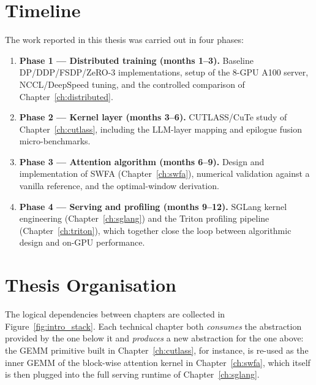 \section{Timeline}\label{sec:intro_timeline}
The work reported in this thesis was carried out in four phases:
\begin{enumerate}
    \item \textbf{Phase 1 --- Distributed training (months 1--3).}
          Baseline DP/DDP/FSDP/ZeRO-3 implementations, setup of the
          8-GPU A100 server, NCCL/DeepSpeed tuning, and the controlled
          comparison of Chapter~\ref{ch:distributed}.
    \item \textbf{Phase 2 --- Kernel layer (months 3--6).} CUTLASS/CuTe
          study of Chapter~\ref{ch:cutlass}, including the LLM-layer
          mapping and epilogue fusion micro-benchmarks.
    \item \textbf{Phase 3 --- Attention algorithm (months 6--9).}
          Design and implementation of SWFA
          (Chapter~\ref{ch:swfa}), numerical validation against a
          vanilla reference, and the optimal-window derivation.
    \item \textbf{Phase 4 --- Serving and profiling (months 9--12).}
          SGLang kernel engineering
          (Chapter~\ref{ch:sglang}) and the Triton profiling pipeline
          (Chapter~\ref{ch:triton}), which together close the loop
          between algorithmic design and on-GPU performance.
\end{enumerate}

\section{Thesis Organisation}\label{sec:intro_organisation}
The logical dependencies between chapters are collected in
Figure~\ref{fig:intro_stack}. Each technical chapter both
\emph{consumes} the abstraction provided by the one below it and
\emph{produces} a new abstraction for the one above: the GEMM
primitive built in Chapter~\ref{ch:cutlass}, for instance, is
re-used as the inner GEMM of the block-wise attention kernel in
Chapter~\ref{ch:swfa}, which itself is then plugged into the full
serving runtime of Chapter~\ref{ch:sglang}.

